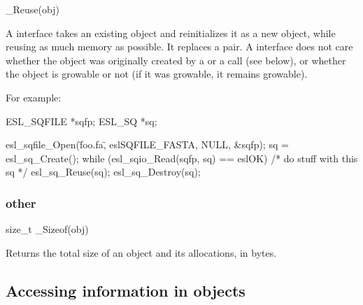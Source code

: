 \begin{sreapi}
\hypertarget{ifc:Reuse}
{\item[\_Reuse(obj)]}

A  interface takes an existing object and
reinitializes it as a new object, while reusing as much memory as
possible. It replaces a  pair. A
 interface does not care whether the object was
originally created by a  or a 
call (see below), or whether the object is growable or not (if it was
growable, it remains growable).
\end{sreapi}

For example:

\begin{cchunk}
   ESL_SQFILE *sqfp;
   ESL_SQ     *sq;

   esl_sqfile_Open(\"foo.fa\", eslSQFILE_FASTA, NULL, &sqfp);
   sq = esl_sq_Create();
   while (esl_sqio_Read(sqfp, sq) == eslOK)
    {
       /* do stuff with this sq */
       esl_sq_Reuse(sq);
    }
   esl_sq_Destroy(sq);
\end{cchunk}

  \subsubsection{other}
\begin{sreapi}
\hypertarget{ifc:Sizeof}
{\item[size_t \_Sizeof(obj)]}

Returns the total size of an object and its allocations, in bytes.
\end{sreapi}


 \subsection{Accessing information in objects}

